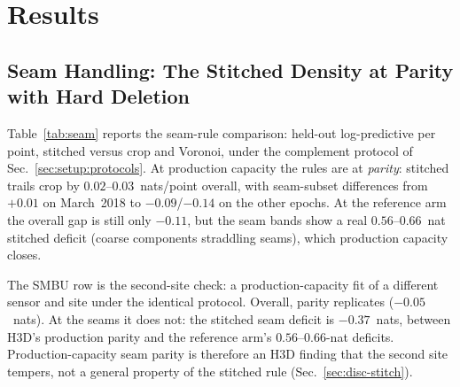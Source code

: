 
\section{Results}
\label{sec:results}

\subsection{Seam Handling: The Stitched Density at Parity with Hard
Deletion}
\label{sec:results:seams}

 Table~\ref{tab:seam} reports the seam-rule comparison: held-out
log-predictive per point, stitched versus crop and Voronoi, under the
complement protocol of Sec.~\ref{sec:setup:protocols}. At production
capacity the rules are at \emph{parity}: stitched trails crop by
$0.02$--$0.03$~nats/point overall, with seam-subset differences from
$+0.01$ on March~2018 to
$-0.09$/$-0.14$ on the other epochs. At the reference arm the overall
gap is still only $-0.11$, but the seam bands show a real
$0.56$--$0.66$~nat stitched deficit (coarse components straddling
seams), which production capacity closes.

 The SMBU row is the second-site check: a production-capacity fit of a
different sensor and site under the identical protocol. Overall,
parity replicates ($-0.05$~nats). At the seams it does not: the
stitched seam deficit is $-0.37$~nats, between H3D's production parity
and the reference arm's $0.56$--$0.66$-nat deficits. Production-capacity
seam parity is therefore an H3D finding that the second site tempers,
not a general property of the stitched rule
(Sec.~\ref{sec:disc-stitch}).

